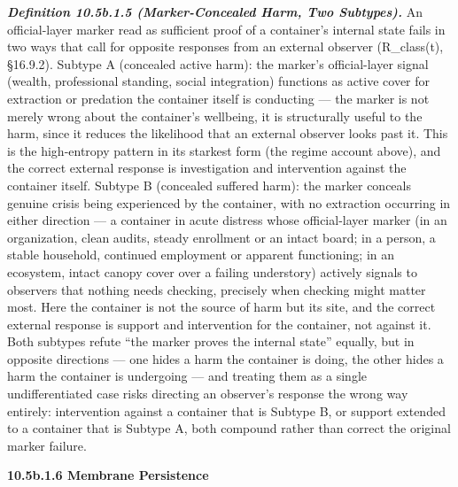 \documentclass[
]{article}
\begin{document}
\emph{\textbf{Definition 10.5b.1.5 (Marker-Concealed Harm, Two
Subtypes).}} An official-layer marker read as sufficient proof of a
container's internal state fails in two ways that call for opposite
responses from an external observer (R\_class(t), §16.9.2). Subtype A
(concealed active harm): the marker's official-layer signal (wealth,
professional standing, social integration) functions as active cover for
extraction or predation the container itself is conducting --- the
marker is not merely wrong about the container's wellbeing, it is
structurally useful to the harm, since it reduces the likelihood that an
external observer looks past it. This is the high-entropy pattern in its
starkest form (the regime account above), and the correct external
response is investigation and intervention against the container itself.
Subtype B (concealed suffered harm): the marker conceals genuine crisis
being experienced by the container, with no extraction occurring in
either direction --- a container in acute distress whose official-layer
marker (in an organization, clean audits, steady enrollment or an intact
board; in a person, a stable household, continued employment or apparent
functioning; in an ecosystem, intact canopy cover over a failing
understory) actively signals to observers that nothing needs checking,
precisely when checking might matter most. Here the container is not the
source of harm but its site, and the correct external response is
support and intervention for the container, not against it. Both
subtypes refute ``the marker proves the internal state'' equally, but in
opposite directions --- one hides a harm the container is doing, the
other hides a harm the container is undergoing --- and treating them as
a single undifferentiated case risks directing an observer's response
the wrong way entirely: intervention against a container that is Subtype
B, or support extended to a container that is Subtype A, both compound
rather than correct the original marker failure.

\textbf{10.5b.1.6 Membrane Persistence}
\end{document}
